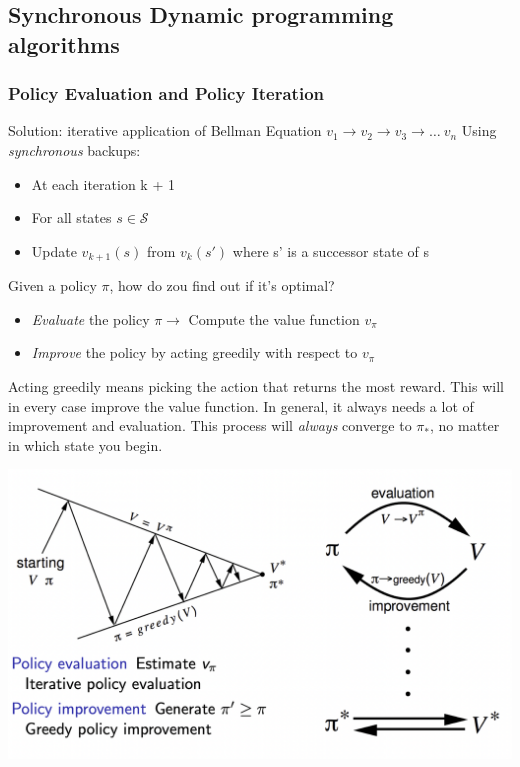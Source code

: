 \documentclass[10pt]{article}
\begin{document}
\subsection{Synchronous Dynamic programming algorithms}
\subsubsection*{Policy Evaluation and Policy Iteration}
Solution: iterative application of Bellman Equation $v_{1} \rightarrow v_{2}  \rightarrow v_{3}  \rightarrow \ldots \ v_{n}$
Using \textit{synchronous} backups:
\begin{itemize}
\item At each iteration k + 1
\item For all states $s \in \mathcal{S}$
\item Update $v_{k+1}(s)$ from $v_{k}(s')$ where s' is a successor state of s
\end{itemize}

Given a policy $\pi$, how do zou find out if it's optimal?
\begin{itemize}
\item \textit{Evaluate} the policy $\pi \rightarrow$ Compute the value function $v_{\pi}$
\item \textit{Improve} the policy by acting greedily with respect to $v_{\pi}$
\end{itemize}
Acting greedily means picking the action that returns the most reward. This will in every case improve the value function. In general, it always needs a lot of improvement and evaluation. This process will \textit{always} converge to $\pi_{*}$, no matter in which state you begin.

\includegraphics[scale=0.35]{pictures/eval_impr.png}
\end{document}
